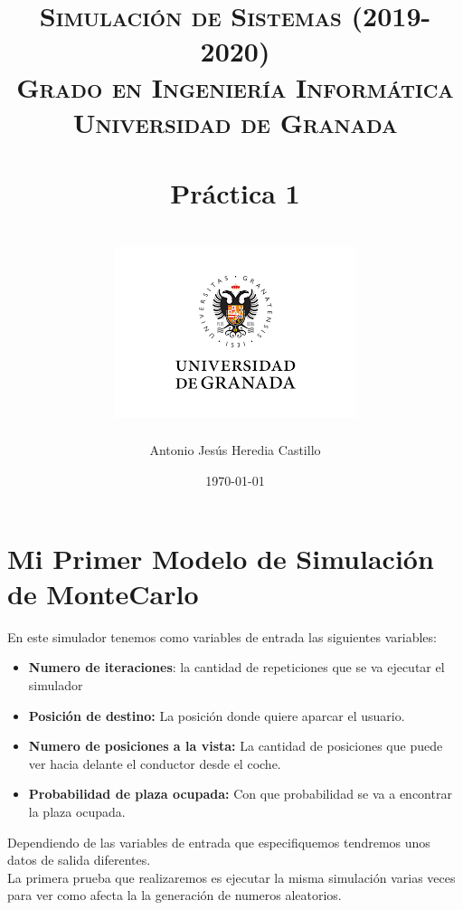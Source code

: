 \documentclass[12pt,a4paper]{article}
\title{
\normalfont \normalsize 
\textsc{{\bf Simulación de Sistemas (2019-2020)} \\ Grado en Ingeniería Informática \\ Universidad de Granada} \\ [25pt] %
\horrule{0.5pt} \\[0.4cm] %
\huge Práctica 1 \\ %
\horrule{2pt} \\[0.5cm] %
\includegraphics{images/logo.png}	
}
\author{Antonio Jesús Heredia Castillo} %
\date{\normalsize\today} %
\begin{document}
\maketitle %
\newpage %
\tableofcontents %
\newpage
\section{Mi Primer Modelo de Simulación de MonteCarlo}
En este simulador tenemos como variables de entrada las siguientes variables:
\begin{itemize}
	\item \textbf{Numero de iteraciones}: la cantidad de repeticiones que se va ejecutar el simulador
	\item \textbf{Posición de destino:} La posición donde quiere aparcar el usuario.
	\item \textbf{Numero de posiciones a la vista:} La cantidad de posiciones que puede ver hacia delante el conductor desde el coche.
	\item \textbf{Probabilidad de plaza ocupada: } Con que probabilidad se va a encontrar la plaza ocupada.
\end{itemize}

Dependiendo de las variables de entrada que especifiquemos tendremos unos datos de salida diferentes. \\
La primera prueba que realizaremos  es ejecutar la misma simulación varias veces para ver como afecta la la generación de numeros aleatorios.
\end{document}
